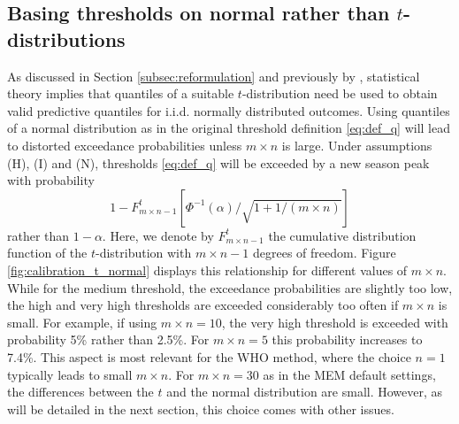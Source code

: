 \documentclass[12pt]{article}
\begin{document}
\subsection{Basing thresholds on normal rather than $t$-distributions}
\label{subsec:normal_vs_t}

As discussed in Section \ref{subsec:reformulation} and previously by \cite{Allevius2020}, statistical theory implies that quantiles of a suitable $t$-distribution need be used to obtain valid predictive quantiles for i.i.d. normally distributed outcomes. Using quantiles of a normal distribution as in the original threshold definition \eqref{eq:def_q} will lead to distorted exceedance probabilities unless $m \times n$ is large. Under assumptions (H), (I) and (N), thresholds \eqref{eq:def_q} will be exceeded by a new season peak with probability
$$
1 - F^t_{m\times n - 1}\left[\Phi^{-1}(\alpha)/\sqrt{1 + 1/(m \times n)}\right]
$$
rather than $1 - \alpha$. Here, we denote by $F^t_{m\times n - 1}$ the cumulative distribution function of the $t$-distribution with $m \times n - 1$ degrees of freedom. Figure \ref{fig:calibration_t_normal} displays this relationship for different values of $m \times n$. While for the medium threshold, the exceedance probabilities are slightly too low, the high and very high thresholds are exceeded considerably too often if $m \times n$ is small. For example, if using $m \times n = 10$, the very high threshold is exceeded with probability 5\% rather than 2.5\%. For $m \times n = 5$ this probability increases to 7.4\%. This aspect is most relevant for the WHO method, where the choice $n = 1$ typically leads to small $m \times n$. For $m \times n = 30$ as in the MEM default settings, the differences between the $t$ and the normal distribution are small. However, as will be detailed in the next section, this choice comes with other issues.
\end{document}
